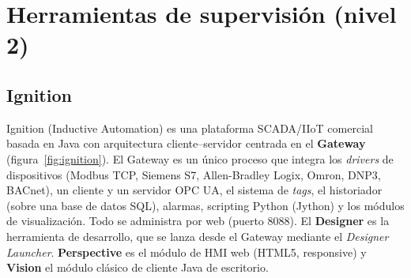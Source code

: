 \section{Herramientas de supervisión (nivel 2)}
\label{sec:scada}

\subsection{Ignition}

Ignition (Inductive Automation) es una plataforma SCADA/IIoT comercial basada en Java con arquitectura cliente--servidor centrada en el \textbf{Gateway} (figura~\ref{fig:ignition}). El Gateway es un único proceso que integra los \emph{drivers} de dispositivos (Modbus TCP, Siemens S7, Allen-Bradley Logix, Omron, DNP3, BACnet), un cliente y un servidor OPC UA, el sistema de \emph{tags}, el historiador (sobre una base de datos SQL), alarmas, scripting Python (Jython) y los módulos de visualización. Todo se administra por web (puerto 8088). El \textbf{Designer} es la herramienta de desarrollo, que se lanza desde el Gateway mediante el \emph{Designer Launcher}. \textbf{Perspective} es el módulo de HMI web (HTML5, responsive) y \textbf{Vision} el módulo clásico de cliente Java de escritorio.

